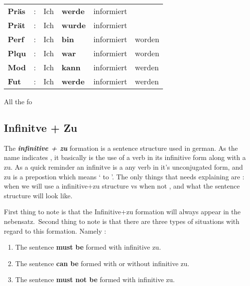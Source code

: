 \documentclass[a4paper,twocolumn,10pt]{article}
\newcommand{\newpar}
{\par \vspace{0.3cm}}
\newcommand{\subsectionend}
{
\nolinenumbers
\linenumbers
}
\newcommand{\tabularxtable}[3]
{

	\vspace{0.5cm}
	\nolinenumbers

	\begin{tabularx}{#1}{#2}
		#3
	\end{tabularx}

	\linenumbers
	\vspace{0.5cm}
}
\begin{document}
\tabularxtable
{0.95\linewidth}
{lllllX}
{


\cellcolor{table-title} \textbf{Präs}  & : & Ich & \textbf{\textcolor{green-goethe}{werde}} & informiert & \\
\cellcolor{table-title} \textbf{Prät}  & : & Ich & \textbf{\textcolor{green-goethe}{wurde}} & informiert & \\
\cellcolor{table-title} \textbf{Perf}  & : & Ich & \textbf{\textcolor{green-goethe}{bin}} & informiert & worden \\
\cellcolor{table-title} \textbf{Plqu}  & : & Ich &\textbf{\textcolor{green-goethe}{war}} & informiert & worden \\
\cellcolor{table-title} \textbf{Mod} & : & Ich & \textbf{\textcolor{green-goethe}{kann}}  & informiert & werden \\
\cellcolor{table-title} \textbf{Fut} & : & Ich & \textbf{\textcolor{green-goethe}{werde}} & informiert & werden \\

}


All the fo





\subsectionend

\subsection{Infinitve + Zu}
\label{ssec:infinitve_zu}

The \textbf{\textit{infinitive + zu}} formation is a sentence structure used in
german. As the name indicates , it basically is the use of a verb in its
infinitive form along with a zu. As a quick reminder an infinitve is a any verb
in it's unconjugated form, and zu is a prepostion which means ` to '. The only
things that needs explaining are : when we will use a infinitive+zu structure vs
when not , and what the sentence structure will look like.\newpar

First thing to note is that the Infinitive+zu formation will always appear in
the nebensatz.\ Second thing to note is that there are three types of situations
with regard to this formation. Namely :



\begin{enumerate}[noitemsep]

	\item The sentence \textbf{must be} formed with infinitive zu.
	\item The sentence \textbf{can be }formed with or without infinitive zu.
	\item The sentence \textbf{must not be} formed with infinitive zu.

\end{enumerate}
\end{document}
